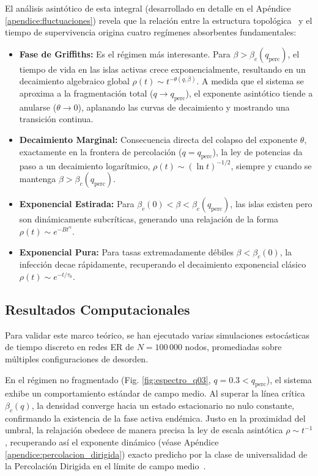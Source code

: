 \documentclass[%
reprint,
amsmath,amssymb,
aps,
]{revtex4-2}
\begin{document}
	El análisis asintótico de esta integral (desarrollado en detalle en el Apéndice \ref{apendice:fluctuaciones}) revela que la relación entre la estructura topológica~\cite{Muñoz2010,Noest1986,Odor2004} y el tiempo de supervivencia origina cuatro regímenes absorbentes fundamentales:
	\begin{itemize}
		\item \textbf{Fase de Griffiths:} Es el régimen más interesante. Para $\beta > \beta_c(q_{\text{perc}})$, el tiempo de vida en las islas activas crece exponencialmente, resultando en un decaimiento algebraico global $\rho(t) \sim t^{-\theta(q, \beta)}$. A medida que el sistema se aproxima a la fragmentación total ($q \to q_{\text{perc}}$), el exponente asintótico tiende a anularse ($\theta \to 0$), aplanando las curvas de decaimiento y mostrando una transición continua.
		\item \textbf{Decaimiento Marginal:} Consecuencia directa del colapso del exponente $\theta$, exactamente en la frontera de percolación ($q = q_{\text{perc}}$), la ley de potencias da paso a un decaimiento logarítmico, $\rho(t) \sim (\ln t)^{-1/2}$, siempre y cuando se mantenga $\beta > \beta_c(q_{\text{perc}})$.
		\item \textbf{Exponencial Estirada:} Para $\beta_c(0) < \beta < \beta_c(q_{\text{perc}})$, las islas existen pero son dinámicamente subcríticas, generando una relajación de la forma $\rho(t) \sim e^{-B t^\alpha}$.
		\item \textbf{Exponencial Pura:} Para tasas extremadamente débiles $\beta < \beta_c(0)$, la infección decae rápidamente, recuperando el decaimiento exponencial clásico $\rho(t) \sim e^{-t/\tau_0}$.
	\end{itemize}
	
	\subsection{Resultados Computacionales}
	
	Para validar este marco teórico, se han ejecutado varias simulaciones estocásticas de tiempo discreto en redes ER de $N=100\,000$ nodos, promediadas sobre múltiples configuraciones de desorden.
	
	En el régimen no fragmentado (Fig. \ref{fig:espectro_q03}, $q=0.3 < q_{\text{perc}}$), el sistema exhibe un comportamiento estándar de campo medio. Al superar la línea crítica $\beta_c(q)$, la densidad converge hacia un estado estacionario no nulo constante, confirmando la existencia de la fase activa endémica. Justo en la proximidad del umbral, la relajación obedece de manera precisa la ley de escala asintótica $\rho \sim t^{-1}$, recuperando así el exponente dinámico (véase Apéndice \ref{apendice:percolacion_dirigida}) exacto predicho por la clase de universalidad de la Percolación Dirigida en el límite de campo medio~\cite{Muñoz2010}.
	
\end{document}

